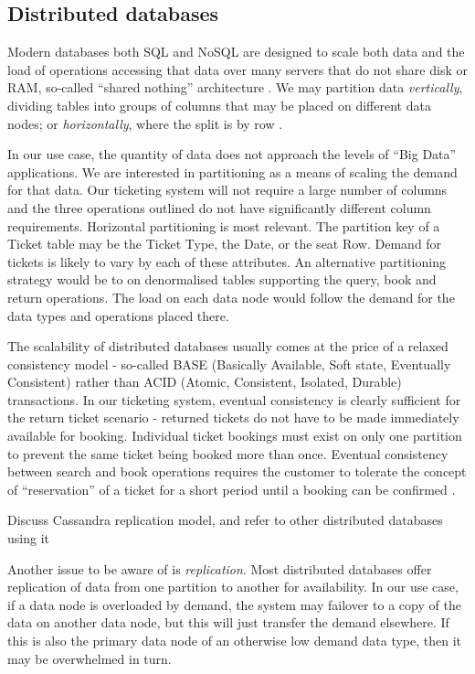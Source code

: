 %
%

\subsection{Distributed databases}
Modern databases both SQL and NoSQL are designed to scale both data and the load of operations accessing that data over many servers that do not share disk or RAM, so-called ``shared nothing'' architecture \cite{RN67}.  We may partition data {\itshape vertically}, dividing tables into groups of columns that may be placed on different data nodes; or {\itshape horizontally}, where the split is by row \cite{RN68}. 

In our use case, the quantity of data does not approach the levels of ``Big Data'' applications.  We are interested in partitioning as a means of scaling the demand for that data.  Our ticketing system will not require a large number of columns and the three operations outlined do not have significantly different column requirements.  Horizontal partitioning is most relevant.  The partition key of a Ticket table may be the Ticket Type, the Date, or the seat Row.  Demand for tickets is likely to vary by each of these attributes.  An alternative partitioning strategy would be to on denormalised tables supporting the query, book and return operations.  The load on each data node would follow the demand for the data types and operations placed there.

The scalability of distributed databases usually comes at the price of a relaxed consistency model - so-called BASE (Basically Available, Soft state, Eventually Consistent) rather than ACID (Atomic, Consistent, Isolated, Durable) transactions.  In our ticketing system, eventual consistency is clearly sufficient for the return ticket scenario - returned tickets do not have to be made immediately available for booking.  Individual ticket bookings must exist on only one partition to prevent the same ticket being booked more than once.  Eventual consistency between search and book operations requires the customer to tolerate the concept of ``reservation'' of a ticket for a short period until a booking can be confirmed \cite{RN1071}\cite{RN67}.

\begin{shaded}
Discuss Cassandra replication model, and refer to other distributed databases using it
\end{shaded}

Another issue to be aware of is {\itshape replication}.   Most distributed databases offer replication of data from one partition to another for availability.  In our use case, if a data node is overloaded by demand, the system may failover to a copy of the data on another data node, but this will just transfer the demand elsewhere.  If this is also the primary data node of an otherwise low demand data type, then it may be overwhelmed in turn.

